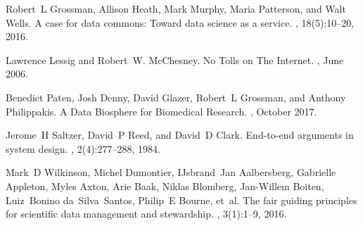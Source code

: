 \documentclass{article}
\begin{document}
\begin{thebibliography}{1}

Robert~L Grossman, Allison Heath, Mark Murphy, Maria Patterson, and Walt Wells.
\newblock A case for data commons: {T}oward data science as a service.
, 18(5):10--20, 2016.

Lawrence Lessig and Robert~W. McChesney.
\newblock No {Tolls} on {The} {Internet}.
, June 2006.

Benedict Paten, Josh Denny, David Glazer, Robert~L Grossman, and Anthony Philippakis.
\newblock A {Data} {Biosphere} for {Biomedical} {Research}.
, October 2017.

Jerome~H Saltzer, David~P Reed, and David~D Clark.
\newblock End-to-end arguments in system design.
, 2(4):277--288, 1984.

Mark~D Wilkinson, Michel Dumontier, IJsbrand~Jan Aalbersberg, Gabrielle Appleton, Myles Axton, Arie Baak, Niklas Blomberg, Jan-Willem Boiten, Luiz~Bonino da~Silva~Santos, Philip~E Bourne, et~al.
\newblock The fair guiding principles for scientific data management and stewardship.
, 3(1):1--9, 2016.

\end{thebibliography}
\end{document}
